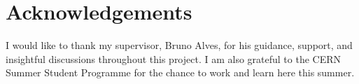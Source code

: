 \section*{Acknowledgements}
I would like to thank my supervisor, Bruno Alves, for his guidance, support,
and insightful discussions throughout this project. I am also grateful to
the CERN Summer Student Programme for the chance to work and learn here this
summer.
